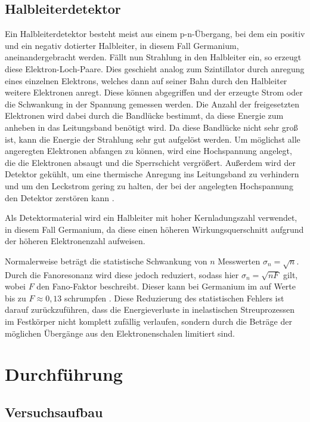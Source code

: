 \documentclass[
	parskip=half,10pt,
	numbers= noenddot, %
	toc=flat, %
	oneside,
	twocolumn,
	]{scrartcl}
\begin{document}
\subsection{Halbleiterdetektor}

Ein Halbleiterdetektor besteht meist aus einem p-n-Übergang, bei dem ein positiv und ein negativ dotierter Halbleiter, in diesem Fall Germanium, aneinandergebracht werden. 
Fällt nun Strahlung in den Halbleiter ein, so erzeugt diese Elektron-Loch-Paare. Dies geschieht analog zum Szintillator durch anregung eines einzelnen Elektrons, 
welches dann auf seiner Bahn durch den Halbleiter weitere Elektronen anregt. Diese können abgegriffen und der erzeugte Strom oder die Schwankung in der Spannung gemessen 
werden. Die Anzahl der freigesetzten Elektronen wird dabei durch die Bandlücke bestimmt, da diese Energie zum anheben in das Leitungsband benötigt wird. Da diese 
Bandlücke nicht sehr groß ist, kann die Energie der Strahlung sehr gut aufgelöst werden. Um möglichst alle angeregten 
Elektronen abfangen zu können, wird eine Hochspannung angelegt, die die Elektronen absaugt und die Sperrschicht vergrößert. Außerdem wird der Detektor gekühlt, um 
eine thermische Anregung ins Leitungsband zu verhindern und um den Leckstrom gering zu halten, der bei der angelegten Hochspannung den Detektor zerstören kann 
\cite{nicoletti}. 

Als Detektormaterial wird ein Halbleiter mit hoher Kernladungszahl verwendet, in diesem Fall Germanium, da diese einen höheren Wirkungsquerschnitt aufgrund der höheren 
Elektronenzahl aufweisen.

Normalerweise beträgt die statistische Schwankung von $n$ Messwerten $\sigma_n = \sqrt{n}$. Durch die Fanoresonanz wird diese jedoch reduziert, sodass hier 
$\sigma_n = \sqrt{n F}$ gilt, wobei $F$ den Fano-Faktor beschreibt. Dieser kann bei Germanium im auf Werte bis zu $F \approx 0,13$ schrumpfen \cite{fano}. 
Diese Reduzierung des statistischen Fehlers ist darauf zurückzuführen, dass die Energieverluste in inelastischen Streuprozessen im Festkörper nicht komplett zufällig 
verlaufen, sondern durch die Beträge der möglichen Übergänge aus den Elektronenschalen limitiert sind.

\section{Durchführung}

\subsection{Versuchsaufbau}
\end{document}
